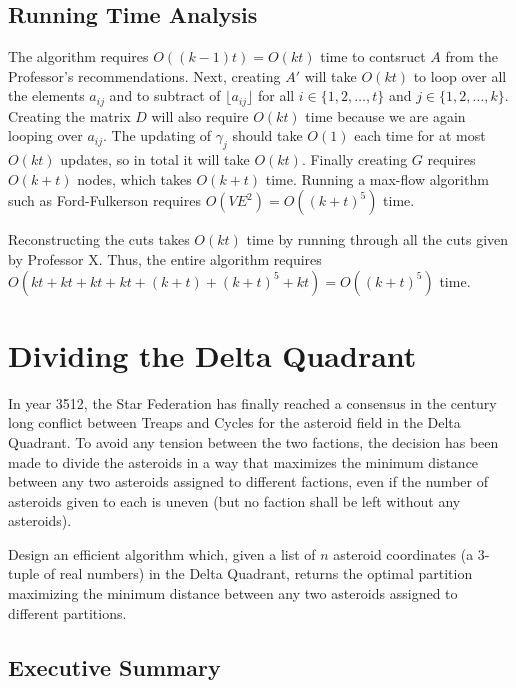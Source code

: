 \documentclass{6046}
\begin{document}
\subsection*{Running Time Analysis}

The algorithm requires $O((k-1)t) = O(kt)$ time to contsruct $A$ from the Professor's recommendations. Next, creating $A'$ will take $O(kt)$ to loop over all the elements $a_{ij}$ and to subtract of $\lfloor a_{ij} \rfloor$ for all $i \in \{1, 2, \ldots, t \}$ and $j \in \{1, 2, \ldots, k \}$. Creating the matrix $D$ will also require $O(kt)$ time because we are again looping over $a_{ij}$. The updating of $\gamma_{j}$ should take $O(1)$ each time for at most $O(kt)$ updates, so in total it will take $O(kt)$. Finally creating $G$ requires $O(k + t)$ nodes, which takes $O(k + t)$ time. Running a max-flow algorithm such as Ford-Fulkerson requires $O(VE^2) = O((k+t)^5)$ time. 

Reconstructing the cuts takes $O(kt)$ time by running through all the cuts given by Professor X. Thus, the entire algorithm requires $O(kt + kt + kt + kt + (k+t) + (k+t)^5 + kt) = O((k+t)^5)$ time. 

\newpage

\section{Dividing the Delta Quadrant}

{\em

In year 3512, the Star Federation has finally reached a consensus in the
century long conflict between Treaps and Cycles for the asteroid field in the
Delta Quadrant. To avoid any tension between the two factions, the decision has
been made to divide the asteroids in a way that maximizes the minimum distance
between any two asteroids assigned to different factions, even if the number of
asteroids given to each is uneven (but no faction shall be left without any
asteroids).

Design an efficient algorithm which, given a list of $n$ asteroid coordinates
(a $3$-tuple of real numbers) in the Delta Quadrant, returns the optimal
partition maximizing the minimum distance between any two asteroids assigned to
different partitions.

}

\subsection*{Executive Summary}
\end{document}
